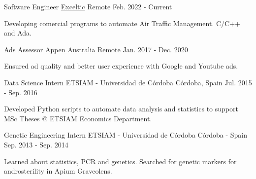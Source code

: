 

\begin{cventries}

  \cventry
    {Software Engineer}
    {\href{https://exceltic.com/}{Exceltic}}
    {Remote}
    {Feb. 2022 - Current}
     {
      \begin{cvitems}
        \item {Developing comercial programs to automate Air Traffic Management. C/C++ and Ada.}
      \end{cvitems}
    }

  \cventry
    {Ads Assessor}
    {\href{https://appen.com/}{Appen Australia}}
    {Remote}
    {Jan. 2017 - Dec. 2020}
     {
      \begin{cvitems}
        \item {Ensured ad quality and better user experience with Google and Youtube ads.}
      \end{cvitems}
    }

  \cventry
    {Data Science Intern}
    {ETSIAM - Universidad de Córdoba}
    {Córdoba, Spain}
    {Jul. 2015 - Sep. 2016}
     {
      \begin{cvitems}
        \item {Developed Python scripts to automate data analysis and statistics to support MSc Theses @ ETSIAM Economics Department.}
      \end{cvitems}
    }

  \cventry
    {Genetic Engineering Intern}
    {ETSIAM - Universidad de Córdoba}
    {Córdoba - Spain}
    {Sep. 2013 - Sep. 2014}
     {
      \begin{cvitems}
        \item {Learned about statistics, PCR and genetics. Searched for genetic markers for androsterility in Apium Graveolens.}
      \end{cvitems}
    }

\end{cventries}
